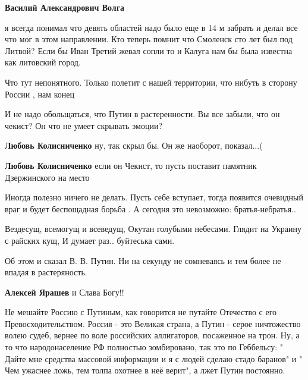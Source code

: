 \begin{itemize}
\begin{itemize}
\textbf{Василий Александрович Волга} 

я всегда понимал что девять областей надо было еще в 14 м забрать и делал все
что мог в этом направлении. Кто теперь помнит что Смоленск сто лет был под
Литвой? Если бы Иван Третий жевал сопли то и Калуга нам бы была известна как
литовский город.

\end{itemize} %

Что тут непонятного. Только полетит с нашей территории, что нибуть в сторону России , нам конец

И не надо обольщаться, что Путин в растеренности. Вы все забыли, что он чекист? Он что не умеет скрывать эмоции?

\begin{itemize} %
\textbf{Любовь Колисниченко} ну, так скрыл бы. Он же наоборот, показал...(

\textbf{Любовь Колисниченко} если он Чекист, то пусть поставит памятник Дзержинского на место
\end{itemize} %


Иногда полезно ничего не делать. Пусть себе вступает, тогда появится очевидный враг и будет беспощадная борьба .
А сегодня это невозможно: братья-небратья..


\obeycr
Вездесущ, всемогущ и всеведущ,
Окутан голубыми небесами.
Глядит на Украину с райских кущ,
И думает раз.. буйтеська сами.
\restorecr

Об этом и сказал В. В. Путин. Ни на секунду не сомневаясь и тем более не впадая в растеряность.

\begin{itemize} %
\textbf{Алексей Ярашев} и Слава Богу!!
\end{itemize} %


Не мешайте Россию с Путиным, как говорится не путайте Отечество с его
Превосходительством. Россия - это Великая страна, а Путин - серое ничтожество
волею судеб, вернее по воле российских аллигаторов, посаженное на трон. Ну, а
то что народонаселение РФ полностью зомбировано, так это по Геббельсу: " Дайте
мне средства массовой информации и я с людей сделаю стадо баранов" и " Чем
ужаснее ложь, тем толпа охотнее в неё верит", а лжет Путин постоянно.


\end{itemize}
